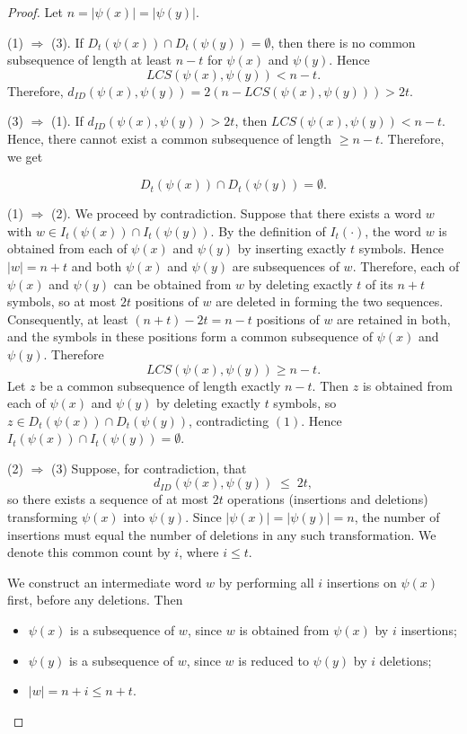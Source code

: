 \documentclass[11 pt]{article}
\numberwithin{equation}{section}
\begin{document}
    \begin{proof}
    Let $n=|\psi(x)|=|\psi(y)|$.
 
    \noindent (1) $\Rightarrow$ (3). If $D_t(\psi(x))\cap D_t(\psi(y))=\emptyset$, then there is no common subsequence of length at least $n-t$ for $\psi(x)$ and $\psi(y)$. Hence
    \[
    LCS(\psi(x),\psi(y)) < n-t.
    \]
    Therefore, \(d_{ID}(\psi(x),\psi(y)) = 2(n-LCS(\psi(x),\psi(y))) > 2t\).
    
    \smallskip
    \noindent (3) $\Rightarrow$ (1). If $d_{ID}(\psi(x),\psi(y))>2t$, then 
    \(LCS(\psi(x),\psi(y))<n-t\). Hence, there cannot exist a common subsequence of length \(\ge n-t\). Therefore, we get 
    
    $$D_t(\psi(x))\cap D_t(\psi(y))=\emptyset.$$

    \smallskip
    \noindent (1) $\Rightarrow$ (2). We proceed by contradiction. Suppose that there exists a word \(w\) with \(w\in I_t(\psi(x))\cap I_t(\psi(y))\). By the definition of $I_t(\cdot)$, the word $w$ is obtained from each of $\psi(x)$ and $\psi(y)$ by inserting exactly $t$ symbols. Hence $|w| = n + t$ and both $\psi(x)$ and $\psi(y)$ are subsequences of $w$. Therefore, each of $\psi(x)$ and $\psi(y)$ can be obtained from $w$ by deleting exactly $t$ of its $n+t$ symbols, so at most $2t$ positions of $w$ are deleted in forming the two sequences. Consequently, at least $(n+t) - 2t = n - t$ positions of $w$ are retained in both, and the symbols in these positions form a common subsequence of $\psi(x)$ and $\psi(y)$. Therefore
    \[
    LCS(\psi(x), \psi(y)) \geq n - t.
    \]
    Let $z$ be a common subsequence of length exactly $n - t$. Then $z$ is obtained from each of $\psi(x)$ and $\psi(y)$ by deleting exactly $t$ symbols, so $z \in D_t(\psi(x)) \cap D_t(\psi(y))$, contradicting $(1)$. Hence $I_t(\psi(x)) \cap I_t(\psi(y)) = \emptyset$.

    \smallskip
    \noindent (2) $\Rightarrow$ (3) 
    Suppose, for contradiction, that 
    \[
    d_{ID}(\psi(x), \psi(y))  \;\leq\; 2t,
    \]
    so there exists a sequence of at most $2t$ operations (insertions and deletions) transforming $\psi(x)$ into $\psi(y)$. Since $|\psi(x)| = |\psi(y)| = n$, the number of insertions must equal the number of deletions in any such transformation. We denote this common count by $i$, where $i \leq t$.

    We construct an intermediate word $w$ by performing all $i$ insertions on $\psi(x)$ first, before any deletions. Then
    \begin{itemize}
    \item $\psi(x)$ is a subsequence of $w$, since $w$ is obtained from 
    $\psi(x)$ by $i$ insertions;
    \item $\psi(y)$ is a subsequence of $w$, since $w$ is reduced to $\psi(y)$ 
    by $i$ deletions;
    \item $|w| = n + i \leq n + t$.
    \end{itemize}


\end{proof}
\end{document}
